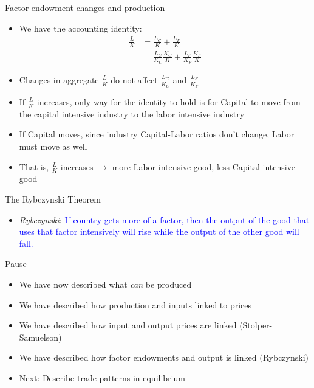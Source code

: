 \documentclass[ignorenonframetext,]{beamer}
\begin{document}
\begin{frame}{Factor endowment changes and production}

    \begin{itemize}
        \item We have the accounting identity:
        \begin{align*}
            \frac{L}{K} &= \frac{L_C}{K} + \frac{L_F}{K} \\
            &= \frac{L_C}{K_C}\frac{K_C}{K} + \frac{L_F}{K_F} \frac{K_F}{K}
        \end{align*}
        \item Changes in aggregate $\frac{L}{K}$ do not affect $\frac{L_C}{K_C}$ and $\frac{L_F}{K_F}$
        \item If $\frac{L}{K}$ increases, only way for the identity to hold is for Capital to move from the capital intensive industry to the labor intensive industry
        \item If Capital moves, since industry Capital-Labor ratios don't change, Labor must move as well
        \item That is, $\frac{L}{K}$ increases $\rightarrow$ more Labor-intensive good, less Capital-intensive good
    \end{itemize}

\end{frame}

\begin{frame}{The Rybczynski Theorem}
    \begin{itemize}
            \item \emph{Rybczynski}: \textcolor{blue}{If country gets more of a factor, then the output of the good that uses that factor intensively will rise while the output of the other good will fall.}
    \end{itemize}
\end{frame}

\begin{frame}{Pause}

    \begin{itemize}
        \item We have now described what \emph{can} be produced
        \item We have described how production and inputs linked to prices
        \item We have described how input and output prices are linked (Stolper-Samuelson)
        \item We have described how factor endowments and output is linked (Rybczynski) 
        \item Next: Describe trade patterns in equilibrium
    \end{itemize}

\end{frame}
\end{document}
